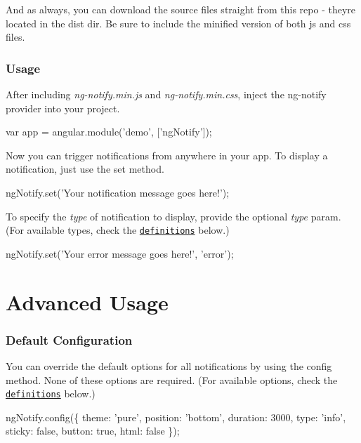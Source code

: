 And as always, you can download the source files straight from this repo -\/ they\textquotesingle{}re located in the {\ttfamily dist} dir. Be sure to include the minified version of both js and css files.

\subsubsection*{Usage}

After including {\itshape ng-\/notify.\+min.\+js} and {\itshape ng-\/notify.\+min.\+css}, inject the ng-\/notify provider into your project.


\begin{DoxyCode}
var app = angular.module('demo', ['ngNotify']);
\end{DoxyCode}


Now you can trigger notifications from anywhere in your app. To display a notification, just use the {\ttfamily set} method.


\begin{DoxyCode}
ngNotify.set('Your notification message goes here!');
\end{DoxyCode}


To specify the {\itshape type} of notification to display, provide the optional {\itshape type} param. (For available types, check the \href{#definitions}{\tt definitions} below.)


\begin{DoxyCode}
ngNotify.set('Your error message goes here!', 'error');
\end{DoxyCode}


\section*{Advanced Usage }

\subsubsection*{Default Configuration}

You can override the default options for all notifications by using the {\ttfamily config} method. None of these options are required. (For available options, check the \href{#definitions}{\tt definitions} below.)


\begin{DoxyCode}
ngNotify.config(\{
    theme: 'pure',
    position: 'bottom',
    duration: 3000,
    type: 'info',
    sticky: false,
    button: true,
    html: false
\});
\end{DoxyCode}


